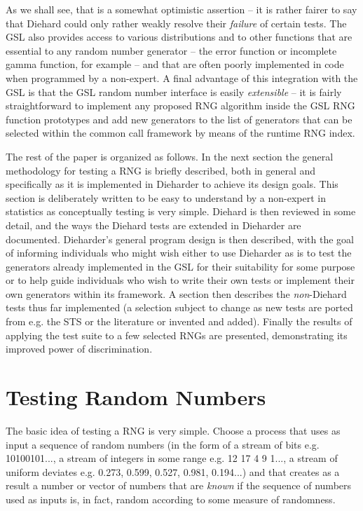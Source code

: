 \documentclass[12pt]{article}
\begin{document}
As we shall see, that is a somewhat optimistic assertion -- it is rather
fairer to say that Diehard could only rather weakly resolve their {\em
failure} of certain tests.  The GSL also provides access to various
distributions and to other functions that are essential to any random
number generator -- the error function or incomplete gamma function, for
example -- and that are often poorly implemented in code when programmed
by a non-expert.  A final advantage of this integration with the GSL is
that the GSL random number interface is easily {\em extensible} -- it is
fairly straightforward to implement any proposed RNG algorithm inside
the GSL RNG function prototypes and add new generators to the list of
generators that can be selected within the common call framework by
means of the runtime RNG index.

The rest of the paper is organized as follows.  In the next section the
general methodology for testing a RNG is briefly described, both in
general and specifically as it is implemented in Dieharder to achieve
its design goals.  This section is deliberately written to be easy to
understand by a non-expert in statistics as conceptually testing is very
simple.  Diehard is then reviewed in some detail, and the ways the
Diehard tests are extended in Dieharder are documented.  Dieharder's
general program design is then described, with the goal of informing
individuals who might wish either to use Dieharder as is to test the
generators already implemented in the GSL for their suitability for some
purpose or to help guide individuals who wish to write their own tests
or implement their own generators within its framework.  A section then
describes the {\em non}-Diehard tests thus far implemented (a selection
subject to change as new tests are ported from e.g. the STS or the
literature or invented and added).  Finally the results of applying the
test suite to a few selected RNGs are presented, demonstrating its
improved power of discrimination.

\section{Testing Random Numbers}

The basic idea of testing a RNG is very simple.  Choose a process that
uses as input a sequence of random numbers (in the form of a stream of
bits e.g. 10100101..., a stream of integers in some range e.g. 12 17 4 9
1..., a stream of uniform deviates e.g. 0.273, 0.599, 0.527, 0.981,
0.194...) and that creates as a result a number or vector of numbers
that are {\em known} if the sequence of numbers used as inputs is, in
fact, random according to some measure of randomness.
\end{document}
